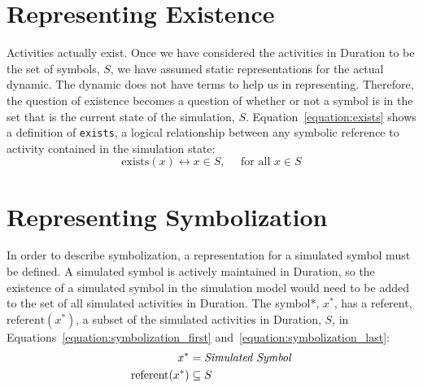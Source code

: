 \section{Representing Existence}

Activities actually exist.  Once we have considered the activities in
Duration to be the set of symbols, $S$, we have assumed static
representations for the actual dynamic.  The dynamic does not have
terms to help us in representing.  Therefore, the question of
existence becomes a question of whether or not a symbol is in the set
that is the current state of the simulation, $S$.
Equation~\ref{equation:exists} shows a definition of {\tt exists}, a
logical relationship between any symbolic reference to activity
contained in the simulation state:
\begin{equation}
\label{equation:exists}
\text{exists}(x) \longleftrightarrow x{\in}S, \text{ ~~~for all }x{\in}S
\end{equation}

\section{Representing Symbolization}

In order to describe symbolization, a representation for a simulated
symbol must be defined.  A simulated symbol is actively maintained in
Duration, so the existence of a simulated symbol in the simulation
model would need to be added to the set of all simulated activities in
Duration.  The symbol*, $x^*$, has a referent, $\text{referent}(x^*)$,
a subset of the simulated activities in Duration, $S$, in
Equations~\ref{equation:symbolization_first}
and~\ref{equation:symbolization_last}:
\begin{align}
\label{equation:symbolization_first}
                 x^* &= \text{\emph{Simulated Symbol}} \\
\text{referent}(x^*) &\subseteq S
\label{equation:symbolization_last}
\end{align}


